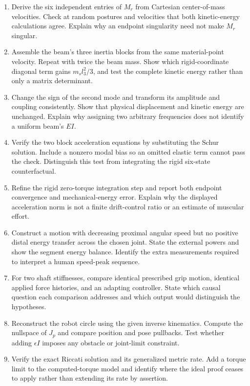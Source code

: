 \begin{enumerate}
\item Derive the six independent entries of $M_r$ from Cartesian center-of-mass velocities. Check at random postures and velocities that both kinetic-energy calculations agree. Explain why an endpoint singularity need not make $M_r$ singular.
\item Assemble the beam's three inertia blocks from the same material-point velocity. Repeat with twice the beam mass. Show which rigid-coordinate diagonal term gains $m_s l_3^2/3$, and test the complete kinetic energy rather than only a matrix determinant.
\item Change the sign of the second mode and transform its amplitude and coupling consistently. Show that physical displacement and kinetic energy are unchanged. Explain why assigning two arbitrary frequencies does not identify a uniform beam's $EI$.
\item Verify the two block acceleration equations by substituting the Schur solution. Include a nonzero modal bias so an omitted elastic term cannot pass the check. Distinguish this test from integrating the rigid six-state counterfactual.
\item Refine the rigid zero-torque integration step and report both endpoint convergence and mechanical-energy error. Explain why the displayed acceleration norm is not a finite drift-control ratio or an estimate of muscular effort.
\item Construct a motion with decreasing proximal angular speed but no positive distal energy transfer across the chosen joint. State the external powers and show the segment energy balance. Identify the extra measurements required to interpret a human speed-peak sequence.
\item For two shaft stiffnesses, compare identical prescribed grip motion, identical applied force histories, and an adapting controller. State which causal question each comparison addresses and which output would distinguish the hypotheses.
\item Reconstruct the robot circle using the given inverse kinematics. Compute the nullspace of $J_p$ and compare position and pose pullbacks. Test whether adding $\epsilon I$ imposes any obstacle or joint-limit constraint.
\item Verify the exact Riccati solution and its generalized metric rate. Add a torque limit to the computed-torque model and identify where the ideal proof ceases to apply rather than extending its rate by assertion.

\end{enumerate}
